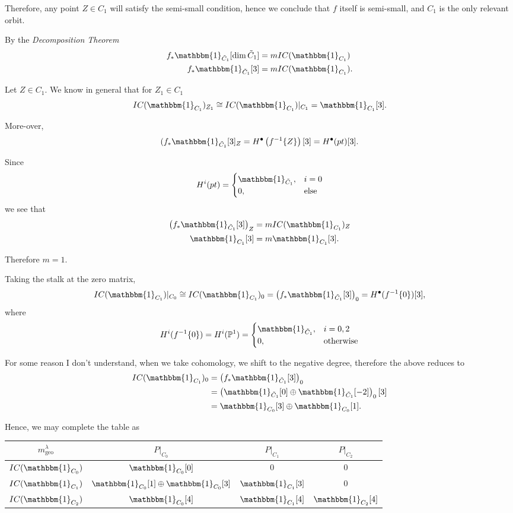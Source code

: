 \documentclass{memoir}
\newcommand{\lb}{\left(}
\newcommand{\rb}{\right)}
\newcommand{\tx}{\text}
\theoremstyle{definition}
\begin{document}
	Therefore, any point $Z\in C_1$ will satisfy the semi-small condition, hence we conclude that $f$ itself is semi-small, and $C_1$ is the only relevant orbit. 
	
	By the \emph{Decomposition Theorem}
	\begin{align*}
		f_\ast\mathbbm{1}_{\tilde{C}_1}[\dim\tilde{C}_1]&=m IC(\mathbbm{1}_{C_1})\\
		f_\ast\mathbbm{1}_{\tilde{C}_1}[3]&=m IC(\mathbbm{1}_{C_1}). 
	\end{align*}
	
	Let $Z\in C_1$.  
	We know in general that for $Z_1\in C_1$
	$$IC(\mathbbm{1}_{C_1})_{Z_1}\cong IC(\mathbbm{1}_{C_1})|_{C_1}=\mathbbm{1}_{C_1}[3].$$
	
	More-over,
	$$(f_\ast\mathbbm{1}_{\tilde{C}_1}[3]_Z=H^\bullet\lb f^{-1}\{Z\}\rb[3]=H^\bullet(pt)[3].$$
	
	Since 
	$$H^i(pt)=\begin{cases}
		\mathbbm{1}_{\tilde{C}_1}, & i=0\\
		0, & \tx{else}
	\end{cases}$$
	we see that
	\begin{align*}
		\lb f_\ast\mathbbm{1}_{\tilde{C}_1}[3]\rb_Z&=mIC(\mathbbm{1}_{C_1})_Z\\
		\mathbbm{1}_{C_1}[3]&=m\mathbbm{1}_{C_1}[3].
	\end{align*}
	
	Therefore $m=1$.  
	
	Taking the stalk at the zero matrix,
	$$IC(\mathbbm{1}_{C_1})|_{C_0}\cong IC(\mathbbm{1}_{C_1})_0=\lb f_\ast\mathbbm{1}_{\tilde{C}_1}[3] \rb_0=H^\bullet(f^{-1}\{0\})[3],$$
	where 
	$$H^i(f^{-1}\{0\})=H^i(\mathbb{P}^1)=\begin{cases}
		\mathbbm{1}_{\tilde{C}_1}, & i=0,2\\
		0, & \tx{otherwise}
	\end{cases}$$
	
	For some reason I don't understand, when we take cohomology, we shift to the negative degree, therefore the above reduces to 
	\begin{align*}
		IC(\mathbbm{1}_{C_1})_0&=\lb f_\ast\mathbbm{1}_{\tilde{C}_1}[3]\rb_0\\
		&=\lb\mathbbm{1}_{\tilde{C}_1}[0]\oplus\mathbbm{1}_{\tilde{C}_1}[-2]\rb_0[3]\\
		&=\mathbbm{1}_{C_0}[3]\oplus\mathbbm{1}_{C_0}[1].
	\end{align*}
	
	Hence, we may complete the table as
	\begin{center}
		\begin{tabular}{c | c c c}
			$m_{\tx{geo}}^\lambda$ & $P|_{C_0}$ & $P|_{C_1}$ & $P|_{C_2}$ \\
			\hline
			$IC(\mathbbm{1}_{C_0})$ & $\mathbbm{1}_{C_0}[0]$ & 0 & 0 \\
			$IC(\mathbbm{1}_{C_1})$ & $\mathbbm{1}_{C_0}[1]\oplus\mathbbm{1}_{C_0}[3]$ & $\mathbbm{1}_{C_1}[3]$ & 0 \\
			$IC(\mathbbm{1}_{C_2})$ & $\mathbbm{1}_{C_0}[4]$ & $\mathbbm{1}_{C_1}[4]$ & $\mathbbm{1}_{C_2}[4]$
		\end{tabular}
	\end{center}
	
\end{document}

